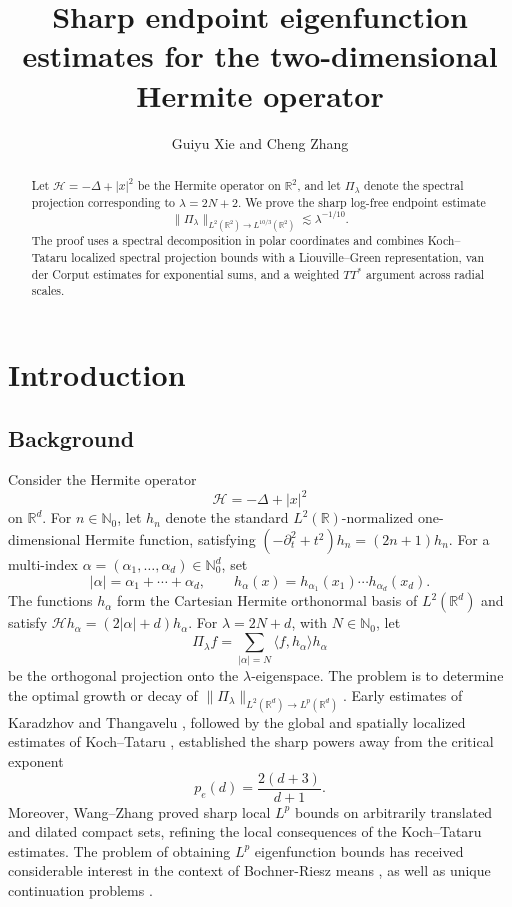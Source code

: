 \documentclass[11pt,a4paper]{amsart}
\title[endpoint eigenfunction estimates]
{Sharp endpoint eigenfunction estimates for the two-dimensional Hermite operator}
\author{Guiyu Xie and Cheng Zhang}
\date{}
\numberwithin{equation}{section}
\newcommand{\R}{\mathbb R}
\newcommand{\calH}{\mathcal H}
\newcommand{\norm}[1]{\lVert #1\rVert}
\begin{document}
\begin{abstract}
Let \(\calH=-\Delta+|x|^2\) be the Hermite operator on \(\R^2\), and let
\(\Pi_\lambda\) denote the spectral projection corresponding to
\(\lambda=2N+2\). We prove the sharp log-free endpoint estimate
\[
\norm{\Pi_\lambda}_{L^2(\R^2)\to L^{10/3}(\R^2)}
\lesssim \lambda^{-1/10}.
\]
The proof uses a spectral decomposition in polar coordinates and combines Koch--Tataru localized spectral projection bounds with a
Liouville--Green representation, van der Corput estimates for exponential sums,
and a weighted \(TT^*\) argument across radial scales.
\end{abstract}
\maketitle

\section{Introduction}

\subsection{Background}
Consider the Hermite operator
\[
 \mathcal H=-\Delta+|x|^2
\]
on \(\R^d\). For \(n\in\mathbb N_0\), let \(h_n\) denote the standard
\(L^2(\R)\)-normalized one-dimensional Hermite function, satisfying
\((-\partial_t^2+t^2)h_n=(2n+1)h_n\). For a multi-index
\(\alpha=(\alpha_1,\ldots,\alpha_d)\in\mathbb N_0^d\), set
\[
 |\alpha|=\alpha_1+\cdots+\alpha_d,
 \qquad
 h_\alpha(x)=h_{\alpha_1}(x_1)\cdots h_{\alpha_d}(x_d).
\]
The functions \(h_\alpha\) form the Cartesian Hermite orthonormal basis of
\(L^2(\R^d)\) and satisfy
\(\mathcal Hh_\alpha=(2|\alpha|+d)h_\alpha\). For \(\lambda=2N+d\), with
\(N\in\mathbb N_0\), let
\[
 \Pi_\lambda f
 =\sum_{|\alpha|=N}\langle f,h_\alpha\rangle h_\alpha
\]
be the orthogonal projection onto the \(\lambda\)-eigenspace. The problem is
to determine the optimal growth or decay of
\(\|\Pi_\lambda\|_{L^2(\R^d)\to L^p(\R^d)}\). Early estimates of Karadzhov \cite{Karadzhov} and
Thangavelu \cite{Thangavelu,Thangavelu1998}, followed by the global and spatially localized estimates of
Koch--Tataru \cite{KochTataru}, established the sharp powers away from the critical exponent
\[
 p_e(d)=\frac{2(d+3)}{d+1}.
\] Moreover, Wang--Zhang \cite{WangZhang} proved sharp local \(L^p\) bounds on arbitrarily translated and
dilated compact sets, refining the local consequences of the Koch--Tataru
estimates. The problem of obtaining $L^p$ eigenfunction bounds has received considerable interest in the context of Bochner-Riesz means \cite{Thangavelu, thang87, Thangavelu1998,Karadzhov, leeadv,chentams, chenadv,chencr,chenjga}, as well as unique continuation problems \cite{esca,ev, kt09}.
\end{document}
